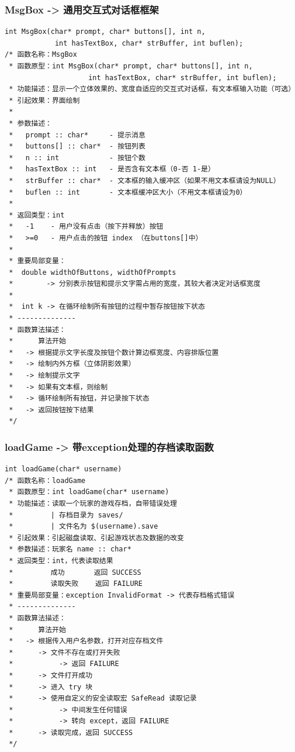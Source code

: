 \documentclass{style/ucasproposal}
\begin{document}
\subsubsection{MsgBox -> 通用交互式对话框框架}
\label{func:MsgBox}
\begin{verbatim}
int MsgBox(char* prompt, char* buttons[], int n,
            int hasTextBox, char* strBuffer, int buflen);
/* 函数名称：MsgBox
 * 函数原型：int MsgBox(char* prompt, char* buttons[], int n,
                    int hasTextBox, char* strBuffer, int buflen);
 * 功能描述：显示一个立体效果的、宽度自适应的交互式对话框，有文本框输入功能（可选）
 * 引起效果：界面绘制
 *
 * 参数描述：
 *   prompt :: char*     - 提示消息
 *   buttons[] :: char*  - 按钮列表
 *   n :: int            - 按钮个数
 *   hasTextBox :: int   - 是否含有文本框（0-否 1-是）
 *   strBuffer :: char*  - 文本框的输入缓冲区（如果不用文本框请设为NULL）
 *   buflen :: int       - 文本框缓冲区大小（不用文本框请设为0）
 *
 * 返回类型：int
 *   -1    - 用户没有点击（按下并释放）按钮
 *   >=0   - 用户点击的按钮 index （在buttons[]中）
 *
 * 重要局部变量：
 *  double widthOfButtons, widthOfPrompts
 *        -> 分别表示按钮和提示文字需占用的宽度，其较大者决定对话框宽度
 *
 *  int k -> 在循环绘制所有按钮的过程中暂存按钮按下状态
 * --------------
 * 函数算法描述：
 *      算法开始
 *   -> 根据提示文字长度及按钮个数计算边框宽度、内容排版位置
 *   -> 绘制内外方框（立体阴影效果）
 *   -> 绘制提示文字
 *   -> 如果有文本框，则绘制
 *   -> 循环绘制所有按钮，并记录按下状态
 *   -> 返回按钮按下结果
 */
\end{verbatim}

\subsubsection{loadGame -> 带exception处理的存档读取函数}
\label{func:loadGame}
\begin{verbatim}
int loadGame(char* username)
/* 函数名称：loadGame
 * 函数原型：int loadGame(char* username)
 * 功能描述：读取一个玩家的游戏存档，自带错误处理
 *         | 存档目录为 saves/
 *         | 文件名为 $(username).save
 * 引起效果：引起磁盘读取、引起游戏状态及数据的改变
 * 参数描述：玩家名 name :: char*
 * 返回类型：int，代表读取结果
 *         成功       返回 SUCCESS
 *         读取失败    返回 FAILURE
 * 重要局部变量：exception InvalidFormat -> 代表存档格式错误
 * --------------
 * 函数算法描述：
 *      算法开始
 *   -> 根据传入用户名参数，打开对应存档文件
 *      -> 文件不存在或打开失败
 *           -> 返回 FAILURE
 *      -> 文件打开成功
 *      -> 进入 try 块
 *      -> 使用自定义的安全读取宏 SafeRead 读取记录
 *           -> 中间发生任何错误
 *           -> 转向 except，返回 FAILURE
 *      -> 读取完成，返回 SUCCESS
 */
\end{verbatim}
\end{document}
